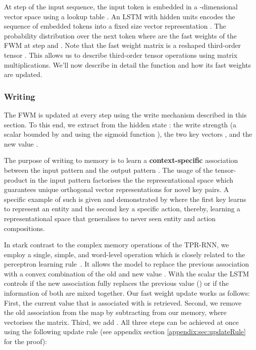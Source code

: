 \documentclass{article} \usepackage{iclr2021_conference,times}
\begin{document}
At step  of the input sequence, the input token  is embedded in a -dimensional vector space using a lookup table . An LSTM with  hidden units encodes the sequence of embedded tokens into a fixed size vector representation . 
The probability distribution over the next token  where  are the fast weights of the FWM at step  and  .
Note that the fast weight matrix  is a reshaped third-order tensor . This allows us to describe third-order tensor operations using matrix multiplications.
We'll now describe in detail the  function and how its fast weights are updated.

\subsubsection{Writing} \label{sec:fwmwiriting}
The FWM is updated at every step  using the write mechanism described in this section.
To this end, we extract from the hidden state : the write strength  (a scalar bounded by  and  using the sigmoid function ), the two key vectors , and the new value . 

The purpose of writing to memory is to learn a \textbf{context-specific} association between the input pattern  and the output pattern . 
The usage of the tensor-product in the input pattern factorises the the representational space which guarantees unique orthogonal vector representations for novel key pairs.
A specific example of such is given and demonstrated by \citet{schlag2018nips} where the first key learns to represent an entity and the second key a specific action, thereby, learning a representational space that generalises to never seen entity and action compositions.

In stark contrast to the complex memory operations of the TPR-RNN, we employ a single, simple, and word-level operation which is closely related to the perceptron learning rule~\citep{rosenblatt1958perceptron}. It allows the model to replace the previous association  with a convex combination of the old and new value .
With the scalar  the LSTM controls if the new association fully replaces the previous value () or if the information of both are mixed together.
Our fast weight update works as follows:
First, the current value  that is associated with  is retrieved.
Second, we remove the old association from the map by subtracting  from our memory, where  vectorises the matrix.
Third, we add .
All three steps can be achieved at once using the following update rule (see appendix section \ref{appendix:sec:updateRule} for the proof):
\end{document}
